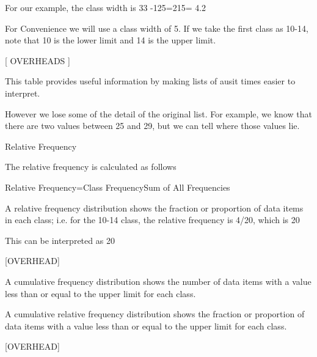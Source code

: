  

For our example, the class width  is 33 -125=215= 4.2

 

For Convenience we will use a class width of 5. If we take the first class as 10-14, note that 10 is the lower limit and 14 is the upper limit.


 [ OVERHEADS ]

 

This table provides useful information by making lists of ausit times easier to interpret.

 

However we lose some of the detail of the original list. For example, we know that there are two values between 25 and 29, but we can tell where those values lie.

 

 

  

 

Relative Frequency 

 

The relative frequency is calculated as follows

 

 

Relative Frequency=Class FrequencySum of All Frequencies

 

A relative frequency distribution shows the fraction or proportion of data items in each class; i.e. for the 10-14 class, the relative frequency is 4/20, which is 20%

 

This can be interpreted as 20%

 

[OVERHEAD]

 

A cumulative frequency distribution shows the number of data items with a value less than or equal to the upper limit for each class.

  


A cumulative relative frequency distribution shows the fraction or proportion of data items with a value less than or equal to the upper limit for each class.

 


[OVERHEAD] 

 

 



 

